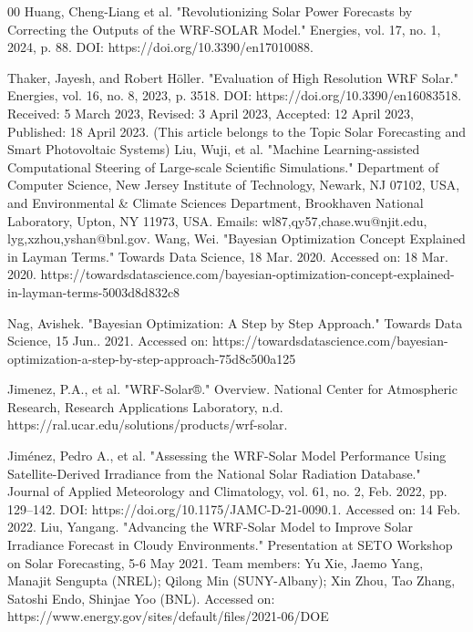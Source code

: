 \documentclass[conference]{IEEEtran}
\begin{document}
\begin{thebibliography}{00}
 Huang, Cheng-Liang et al. "Revolutionizing Solar Power Forecasts by Correcting the Outputs of the WRF-SOLAR Model." Energies, vol. 17, no. 1, 2024, p. 88. DOI: https://doi.org/10.3390/en17010088.

 Thaker, Jayesh, and Robert Höller. "Evaluation of High Resolution WRF Solar." Energies, vol. 16, no. 8, 2023, p. 3518. DOI: https://doi.org/10.3390/en16083518. Received: 5 March 2023, Revised: 3 April 2023, Accepted: 12 April 2023, Published: 18 April 2023. (This article belongs to the Topic Solar Forecasting and Smart Photovoltaic Systems)
 Liu, Wuji, et al. "Machine Learning-assisted Computational Steering of Large-scale Scientific Simulations." Department of Computer Science, New Jersey Institute of Technology, Newark, NJ 07102, USA, and Environmental \& Climate Sciences Department, Brookhaven National Laboratory, Upton, NY 11973, USA. Emails: {wl87,qy57,chase.wu}@njit.edu, {lyg,xzhou,yshan}@bnl.gov.
 Wang, Wei. "Bayesian Optimization Concept Explained in Layman Terms." Towards Data Science, 18 Mar. 2020. Accessed on: 18 Mar. 2020. https://towardsdatascience.com/bayesian-optimization-concept-explained-in-layman-terms-5003d8d832c8

 Nag, Avishek. "Bayesian Optimization: A Step by Step Approach." Towards Data Science, 15 Jun.. 2021. Accessed on: https://towardsdatascience.com/bayesian-optimization-a-step-by-step-approach-75d8c500a125

 Jimenez, P.A., et al. "WRF-Solar®." Overview. National Center for Atmospheric Research, Research Applications Laboratory, n.d. https://ral.ucar.edu/solutions/products/wrf-solar.

 Jiménez, Pedro A., et al. "Assessing the WRF-Solar Model Performance Using Satellite-Derived Irradiance from the National Solar Radiation Database." Journal of Applied Meteorology and Climatology, vol. 61, no. 2, Feb. 2022, pp. 129–142. DOI: https://doi.org/10.1175/JAMC-D-21-0090.1. Accessed on: 14 Feb. 2022.
 Liu, Yangang. "Advancing the WRF-Solar Model to Improve Solar Irradiance Forecast in Cloudy Environments." Presentation at SETO Workshop on Solar Forecasting, 5-6 May 2021. Team members: Yu Xie, Jaemo Yang, Manajit Sengupta (NREL); Qilong Min (SUNY-Albany); Xin Zhou, Tao Zhang, Satoshi Endo, Shinjae Yoo (BNL). Accessed on: https://www.energy.gov/sites/default/files/2021-06/DOE%


\end{thebibliography}
\end{document}
